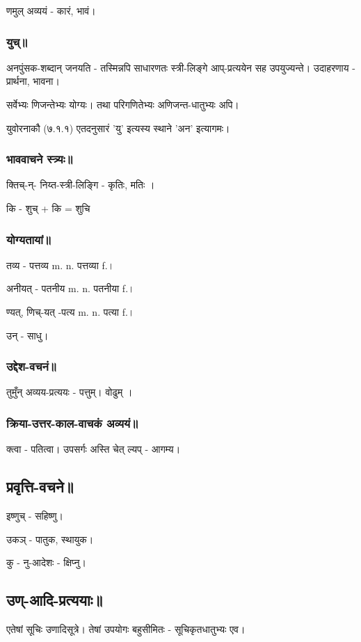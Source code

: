\documentclass[oneside, article]{memoir}
\begin{document}
णमुल् अव्ययं - कारं, भावं।

\subsubsection{युच्॥}
अनपुंसक-शब्दान् जनयति - तस्मिन्नपि साधारणतः स्त्री-लिङ्गे आप्-प्रत्ययेन सह उपयुज्यन्ते। उदाहरणाय - प्रार्थना, भावना।

सर्वेभ्यः णिजन्तेभ्यः योग्यः। तथा परिगणितेभ्यः अणिजन्त-धातुभ्यः अपि।

युवोरनाकौ (७.१.१) एतदनुसारं ’यु’ इत्यस्य स्थाने ’अन’ इत्यागमः।

\subsubsection{भाववाचने स्त्र्यः॥}
क्तिच्-न्- निय्त-स्त्री-लिङ्गि - कृतिः, मतिः ।

कि - शुच् + कि = शुचि

\subsubsection{योग्यतायां॥}
तव्य - पत्तव्य m. n. पत्तव्या f.। 

अनीयत् - पतनीय m. n. पतनीया f.।

ण्यत्, णिच्-यत् -पत्य m. n. पत्या f.।

उन् - साधु।

\subsubsection{उद्देश-वचनं॥}
तुमुँन् अव्यय-प्रत्ययः - पत्तुम्। वोढुम् । 

\subsubsection{क्रिया-उत्तर-काल-वाचकं अव्ययं॥}
क्त्वा - पतित्वा। उपसर्गः अस्ति चेत् ल्यप् - आगम्य।

\subsection{प्रवृत्ति-वचने॥}
इष्णुच् - सहिष्णु।

उकञ् - पातुक, स्थायुक।

कु - नु-आदेशः - क्षिप्नु।

\subsection{उण्-आदि-प्रत्ययाः॥}
एतेषां सूचिः उणादिसूत्रे। तेषां उपयोगः बहुसीमितः - सूचिकृतधातुभ्यः एव।
\end{document}
